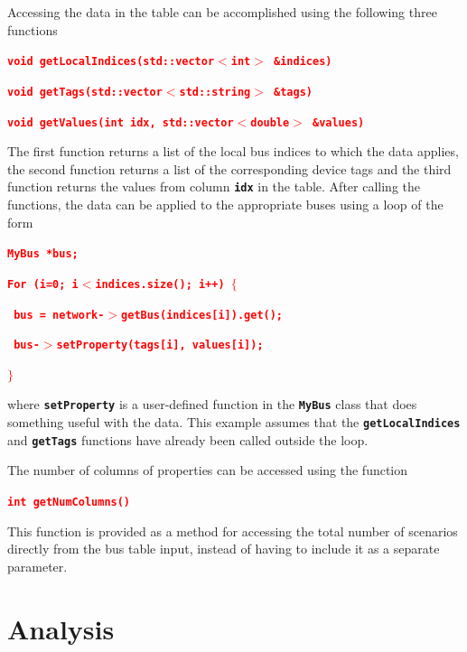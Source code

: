 \documentclass[12pt]{report} %
\begin{document}
Accessing the data in the table can be accomplished using the following three functions

\textcolor{red}{\texttt{\textbf{void getLocalIndices(std::vector$\boldsymbol{\mathrm{<}}$int$\boldsymbol{\mathrm{>}}$ \&indices)}}}

\textcolor{red}{\texttt{\textbf{void getTags(std::vector$\boldsymbol{\mathrm{<}}$std::string$\boldsymbol{\mathrm{>}}$ \&tags)}}}

\textcolor{red}{\texttt{\textbf{void getValues(int idx, std::vector$\boldsymbol{\mathrm{<}}$double$\boldsymbol{\mathrm{>}}$ \&values)}}}

The first function returns a list of the local bus indices to which the data applies, the second function returns a list of the corresponding device tags and the third function returns the values from column \texttt{\textbf{idx}} in the table.
After calling the functions, the data can be applied to the appropriate buses using a loop of the form

\textcolor{red}{\texttt{\textbf{MyBus *bus;}}}

\textcolor{red}{\texttt{\textbf{For (i=0; i$\boldsymbol{\mathrm{<}}$indices.size(); i++) $\boldsymbol{\mathrm{\{}}$}}}

\textcolor{red}{\texttt{\textbf{  bus = network-$\boldsymbol{\mathrm{>}}$getBus(indices[i]).get();}}}

\textcolor{red}{\texttt{\textbf{  bus-$\boldsymbol{\mathrm{>}}$setProperty(tags[i], values[i]);}}}

\textcolor{red}{\texttt{\textbf{$\boldsymbol{\mathrm{\}}}$}}}

where \texttt{\textbf{setProperty}} is a user-defined function in the \texttt{\textbf{MyBus}} class that does something useful with the data. This example assumes that the \texttt{\textbf{getLocalIndices}} and \texttt{\textbf{getTags}} functions have already been called outside the loop.

The number of columns of properties can be accessed using the function

\textcolor{red}{\texttt{\textbf{int getNumColumns()}}}

This function is provided as a method for accessing the total number of scenarios directly from the bus table input, instead of having to include it as a separate parameter.

\section{Analysis}
\end{document}
